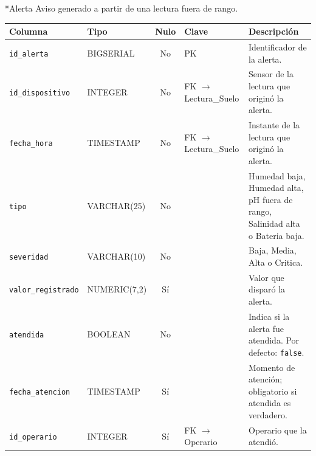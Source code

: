 \documentclass[11pt,letterpaper]{article}
\makeatletter
\renewcommand\subsubsection{\@startsection{subsubsection}{3}{\z@}{-3.25ex\@plus -1ex \@minus -.2ex}{1.5ex \@plus .2ex}{\normalfont\normalsize\bfseries}}
\makeatother
\begin{document}
\subsubsection*{Alerta}
Aviso generado a partir de una lectura fuera de rango.
{\footnotesize
\begin{longtable}{>{\raggedright\arraybackslash}p{3.3cm}>{\raggedright\arraybackslash}p{2.5cm}c>{\raggedright\arraybackslash}p{2.2cm}>{\raggedright\arraybackslash}p{6.1cm}}
\toprule
\textbf{Columna} & \textbf{Tipo} & \textbf{Nulo} & \textbf{Clave} & \textbf{Descripción} \\
\midrule
\endhead
\texttt{id\_alerta} & BIGSERIAL & No & PK & Identificador de la alerta. \\
\texttt{id\_dispositivo} & INTEGER & No & FK $\to$ Lectura\_Suelo & Sensor de la lectura que originó la alerta. \\
\texttt{fecha\_hora} & TIMESTAMP & No & FK $\to$ Lectura\_Suelo & Instante de la lectura que originó la alerta. \\
\texttt{tipo} & VARCHAR(25) & No &  & Humedad baja, Humedad alta, pH fuera de rango, Salinidad alta o Bateria baja. \\
\texttt{severidad} & VARCHAR(10) & No &  & Baja, Media, Alta o Critica. \\
\texttt{valor\_registrado} & NUMERIC(7,2) & Sí &  & Valor que disparó la alerta. \\
\texttt{atendida} & BOOLEAN & No &  & Indica si la alerta fue atendida. Por defecto: \texttt{false}. \\
\texttt{fecha\_atencion} & TIMESTAMP & Sí &  & Momento de atención; obligatorio si atendida es verdadero. \\
\texttt{id\_operario} & INTEGER & Sí & FK $\to$ Operario & Operario que la atendió. \\
\bottomrule
\end{longtable}}
\medskip
\end{document}

